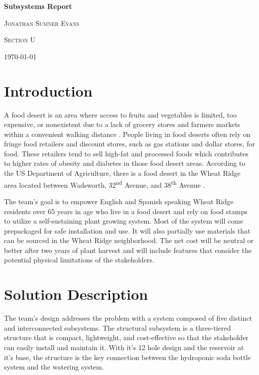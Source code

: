 \documentclass[12pt]{article}
\let\supscr=\textsuperscript
\newcommand{\graytext}[1]{{\leavevmode\color{gray}#1}}
\begin{document}
\begin{titlepage}
    \centering
    \vspace{15cm}
    {\huge\bfseries Subsystems Report \par}
    \vspace{1cm}
    {\scshape\Large Jonathan Sumner Evans\par}
    \vfill
    {\scshape\large Section U\par}
    {\large \today\par}
    \vfill
\end{titlepage}

\tableofcontents

\graytext{
    \pagebreak
    \section{Introduction}
    A food desert is an area where access to fruits and vegetables is limited, too expensive, or
    nonexistent due to a lack of grocery stores and farmers markets within a convenient walking
    distance \cite{cdc-food-deserts}. People living in food deserts often rely on fringe food
    retailers and discount stores, such as gas stations and dollar stores, for food. These retailers
    tend to sell high-fat and processed foods which contributes to higher rates of obesity and
    diabetes in those food desert areas. According to the US Department of Agriculture, there is a
    food desert in the Wheat Ridge area located between Wadsworth, 32\supscr{nd} Avenue, and
    38\supscr{th} Avenue \cite{usda-food-deserts}.

    The team’s goal is to empower English and Spanish speaking Wheat Ridge residents over 65 years
    in age who live in a food desert and rely on food stamps to utilize a self-sustaining plant
    growing system. Most of the system will come prepackaged for safe installation and use. It will
    also partially use materials that can be sourced in the Wheat Ridge neighborhood. The net cost
    will be neutral or better after two years of plant harvest and will include features that
    consider the potential physical limitations of the stakeholders.

    \section{Solution Description}
    The team’s design addresses the problem with a system composed of five distinct and
    interconnected subsystems. The structural subsystem is a three-tiered structure that is compact,
    lightweight, and cost-effective so that the stakeholder can easily install and maintain it. With
    it’s 12 hole design and the reservoir at it’s base, the structure is the key connection between
    the hydroponic soda bottle system and the watering system. 

}
\end{document}
